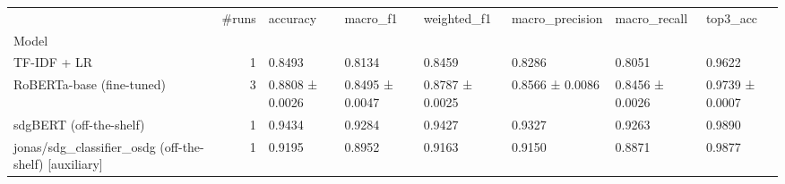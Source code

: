 \begin{tabular}{lrllllll}
\toprule
 & #runs & accuracy & macro_f1 & weighted_f1 & macro_precision & macro_recall & top3_acc \\
Model &  &  &  &  &  &  &  \\
\midrule
TF-IDF + LR & 1 & 0.8493 & 0.8134 & 0.8459 & 0.8286 & 0.8051 & 0.9622 \\
RoBERTa-base (fine-tuned) & 3 & 0.8808 ± 0.0026 & 0.8495 ± 0.0047 & 0.8787 ± 0.0025 & 0.8566 ± 0.0086 & 0.8456 ± 0.0026 & 0.9739 ± 0.0007 \\
sdgBERT (off-the-shelf) & 1 & 0.9434 & 0.9284 & 0.9427 & 0.9327 & 0.9263 & 0.9890 \\
jonas/sdg_classifier_osdg (off-the-shelf)  [auxiliary] & 1 & 0.9195 & 0.8952 & 0.9163 & 0.9150 & 0.8871 & 0.9877 \\
\bottomrule
\end{tabular}
